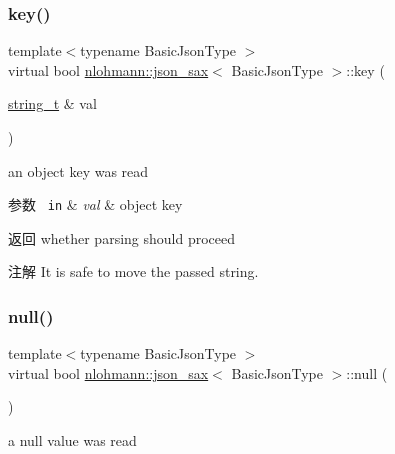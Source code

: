 \subsubsection{\texorpdfstring{key()}{key()}}
{\footnotesize\ttfamily template$<$typename Basic\+Json\+Type $>$ \\
virtual bool \mbox{\hyperlink{structnlohmann_1_1json__sax}{nlohmann\+::json\+\_\+sax}}$<$ Basic\+Json\+Type $>$\+::key (\begin{DoxyParamCaption}\item[{\mbox{\hyperlink{structnlohmann_1_1json__sax_ae01977a9f3c5b3667b7a2929ed91061e}{string\+\_\+t}} \&}]{val }\end{DoxyParamCaption})\hspace{0.3cm}{\ttfamily [pure virtual]}}



an object key was read 


\begin{DoxyParams}[1]{参数}
\mbox{\texttt{ in}}  & {\em val} & object key \\
\hline
\end{DoxyParams}
\begin{DoxyReturn}{返回}
whether parsing should proceed 
\end{DoxyReturn}
\begin{DoxyNote}{注解}
It is safe to move the passed string. 
\end{DoxyNote}
\mbox{\label{structnlohmann_1_1json__sax_a0ad26edef3f8d530dcec3192bba82df6}} 
\subsubsection{\texorpdfstring{null()}{null()}}
{\footnotesize\ttfamily template$<$typename Basic\+Json\+Type $>$ \\
virtual bool \mbox{\hyperlink{structnlohmann_1_1json__sax}{nlohmann\+::json\+\_\+sax}}$<$ Basic\+Json\+Type $>$\+::null (\begin{DoxyParamCaption}{ }\end{DoxyParamCaption})\hspace{0.3cm}{\ttfamily [pure virtual]}}



a null value was read 


